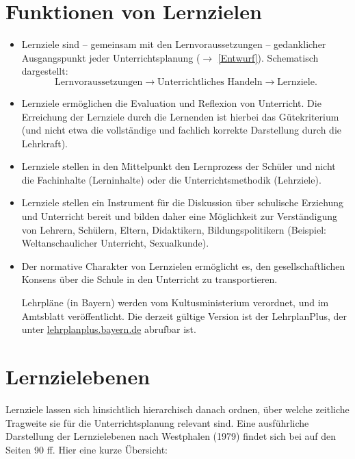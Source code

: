 \section{Funktionen von Lernzielen}
\begin{itemize}
	\item Lernziele sind -- gemeinsam mit den Lernvoraussetzungen -- gedanklicher Ausgangspunkt jeder Unterrichtsplanung ($\to$ \cref{Entwurf}). Schematisch dargestellt: \begin{equation*}
		\text{Lernvoraussetzungen} \longrightarrow \text{Unterrichtliches Handeln} \longrightarrow \text{Lernziele.}
	\end{equation*}
	\item Lernziele ermöglichen die Evaluation und Reflexion von Unterricht. Die Erreichung der Lernziele durch die Lernenden ist hierbei das Gütekriterium (und nicht etwa die vollständige und fachlich korrekte Darstellung durch die Lehrkraft).
	\item Lernziele stellen in den Mittelpunkt den Lernprozess der
	Sch\"{u}ler und nicht die Fachinhalte (Lerninhalte) oder
	die Unterrichtsmethodik (Lehrziele).
	\item
	Lernziele stellen ein Instrument f\"{u}r die Diskussion \"{u}ber
	schulische Erziehung und Unterricht bereit und bilden
	daher eine M\"{o}glichkeit zur Verst\"{a}ndigung von Lehrern,
	Sch\"{u}lern, Eltern, Didaktikern, Bildungspolitikern
	(Beispiel: Weltanschaulicher Unterricht, Sexualkunde).
	\item
	Der normative Charakter von Lernzielen erm\"{o}glicht es, den
	gesellschaftlichen Konsens \"{u}ber die Schule in den Unterricht zu
	transportieren.
	
	\mip
	Lehrpl\"{a}ne (in Bayern) werden vom Kultusministerium verordnet,
	und im Amtsblatt ver\"{o}ffentlicht. Die derzeit gültige Version ist der LehrplanPlus, der unter \url{lehrplanplus.bayern.de} abrufbar ist.
\end{itemize}

\section{Lernzielebenen}

Lernziele lassen sich hinsichtlich hierarchisch danach ordnen, über welche zeitliche Tragweite sie für die Unterrichtsplanung relevant sind. Eine ausführliche Darstellung der Lernzielebenen nach Westphalen (1979) findet sich bei \textcite{KircherGirwidzHaussler1} auf den Seiten 90 ff. Hier eine kurze Übersicht:

